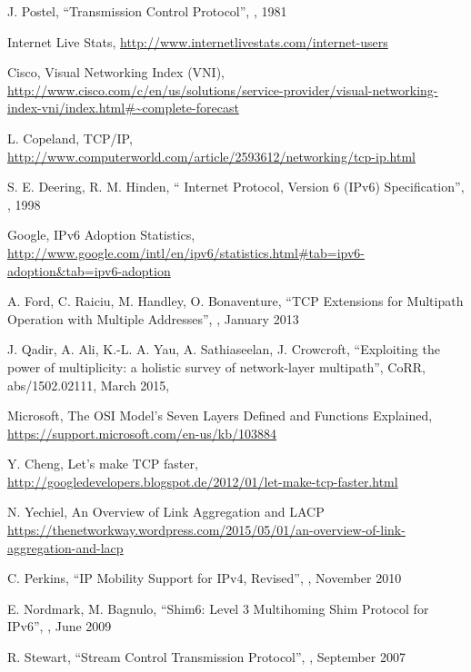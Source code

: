\begin{thebibliography}{99}

J. Postel,
``Transmission Control Protocol'',
, 1981

Internet Live Stats,
\url{http://www.internetlivestats.com/internet-users}

Cisco, Visual Networking Index (VNI),
\url{http://www.cisco.com/c/en/us/solutions/service-provider/visual-networking-index-vni/index.html#~complete-forecast}

L. Copeland, TCP/IP,
\url{http://www.computerworld.com/article/2593612/networking/tcp-ip.html}

S. E. Deering, R. M. Hinden,
`` Internet Protocol, Version 6 (IPv6) Specification'',
, 1998

Google, IPv6 Adoption Statistics,
\url{http://www.google.com/intl/en/ipv6/statistics.html#tab=ipv6-adoption&tab=ipv6-adoption}

A. Ford, C. Raiciu, M. Handley, O. Bonaventure,
``TCP Extensions for Multipath Operation with Multiple Addresses'',
, January 2013

J. Qadir, A. Ali, K.{-}L. A. Yau, A. Sathiaseelan, J. Crowcroft, 
``Exploiting the power of multiplicity: a holistic survey of network-layer multipath'',
CoRR,
abs/1502.02111,
March 2015,

Microsoft, The OSI Model's Seven Layers Defined and Functions Explained,
\url{https://support.microsoft.com/en-us/kb/103884}

Y. Cheng, Let's make TCP faster,
\url{http://googledevelopers.blogspot.de/2012/01/let-make-tcp-faster.html}

N. Yechiel, An Overview of Link Aggregation and LACP
\url{https://thenetworkway.wordpress.com/2015/05/01/an-overview-of-link-aggregation-and-lacp}

C. Perkins,
``IP Mobility Support for IPv4, Revised'',
,  November 2010

E. Nordmark,  M. Bagnulo,
``Shim6: Level 3 Multihoming Shim Protocol for IPv6'',
,  June 2009

R. Stewart,
``Stream Control Transmission Protocol'',
,  September 2007


\end{thebibliography}

